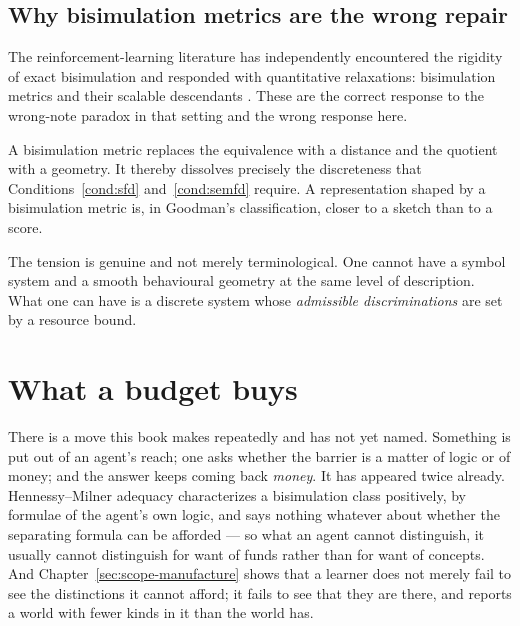 \subsection{Why bisimulation metrics are the wrong repair}
\label{sec:metrics}

The reinforcement-learning literature has independently encountered
the rigidity of exact bisimulation and responded with quantitative
relaxations: bisimulation metrics \cite{ferns2004} and their
scalable descendants \cite{gelada2019,zhang2021,castro2021}.
These are the correct response to the wrong-note paradox in that
setting and the wrong response here.

\begin{observation}
\label{obs:metric}
A bisimulation metric replaces the equivalence with a distance and
the quotient with a geometry.
It thereby dissolves precisely the discreteness that
Conditions~\ref{cond:sfd} and~\ref{cond:semfd} require.
A representation shaped by a bisimulation metric is, in Goodman's
classification, closer to a sketch than to a score.
\end{observation}

\noindent
The tension is genuine and not merely terminological.
One cannot have a symbol system and a smooth behavioural geometry
at the same level of description.
What one can have is a discrete system whose \emph{admissible
discriminations} are set by a resource bound.

\section{What a budget buys}
\label{sec:budget}

There is a move this book makes repeatedly and has not yet named.
Something is put out of an agent's reach; one asks whether the
barrier is a matter of logic or of money; and the answer keeps
coming back \emph{money}.
It has appeared twice already.
Hennessy--Milner adequacy characterizes a bisimulation class
positively, by formulae of the agent's own logic, and says nothing
whatever about whether the separating formula can be afforded ---
so what an agent cannot distinguish, it usually cannot distinguish
for want of funds rather than for want of concepts.
And Chapter~\ref{sec:scope-manufacture} shows that a learner does
not merely fail to see the distinctions it cannot afford; it fails
to see that they are there, and reports a world with fewer kinds in
it than the world has.

